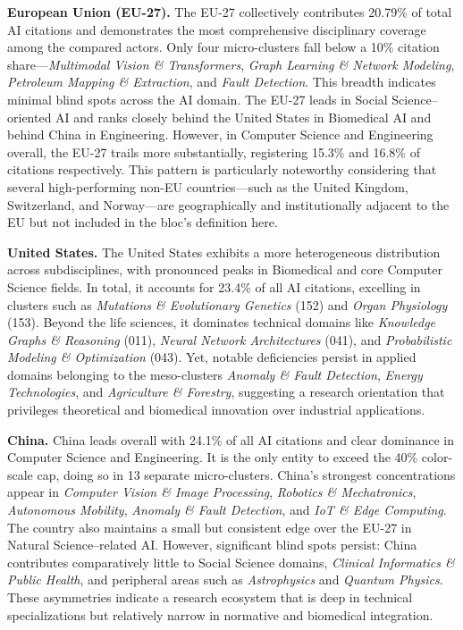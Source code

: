 \documentclass{article}
\begin{document}
\textbf{European Union (EU-27).}  
The EU-27 collectively contributes 20.79\% of total AI citations and demonstrates the most comprehensive disciplinary coverage among the compared actors. Only four micro-clusters fall below a 10\% citation share—\textit{Multimodal Vision \& Transformers}, \textit{Graph Learning \& Network Modeling}, \textit{Petroleum Mapping \& Extraction}, and \textit{Fault Detection}. This breadth indicates minimal blind spots across the AI domain. The EU-27 leads in Social Science–oriented AI and ranks closely behind the United States in Biomedical AI and behind China in Engineering. However, in Computer Science and Engineering overall, the EU-27 trails more substantially, registering 15.3\% and 16.8\% of citations respectively. This pattern is particularly noteworthy considering that several high-performing non-EU countries—such as the United Kingdom, Switzerland, and Norway—are geographically and institutionally adjacent to the EU but not included in the bloc’s definition here.

\textbf{United States.}  
The United States exhibits a more heterogeneous distribution across subdisciplines, with pronounced peaks in Biomedical and core Computer Science fields. In total, it accounts for 23.4\% of all AI citations, excelling in clusters such as \textit{Mutations \& Evolutionary Genetics} (152) and \textit{Organ Physiology} (153). Beyond the life sciences, it dominates technical domains like \textit{Knowledge Graphs \& Reasoning} (011), \textit{Neural Network Architectures} (041), and \textit{Probabilistic Modeling \& Optimization} (043). Yet, notable deficiencies persist in applied domains belonging to the meso-clusters \textit{Anomaly \& Fault Detection}, \textit{Energy Technologies}, and \textit{Agriculture \& Forestry}, suggesting a research orientation that privileges theoretical and biomedical innovation over industrial applications.

\textbf{China.}  
China leads overall with 24.1\% of all AI citations and clear dominance in Computer Science and Engineering. It is the only entity to exceed the 40\% color-scale cap, doing so in 13 separate micro-clusters. China’s strongest concentrations appear in \textit{Computer Vision \& Image Processing}, \textit{Robotics \& Mechatronics}, \textit{Autonomous Mobility}, \textit{Anomaly \& Fault Detection}, and \textit{IoT \& Edge Computing}. The country also maintains a small but consistent edge over the EU-27 in Natural Science–related AI. However, significant blind spots persist: China contributes comparatively little to Social Science domains, \textit{Clinical Informatics \& Public Health}, and peripheral areas such as \textit{Astrophysics} and \textit{Quantum Physics}. These asymmetries indicate a research ecosystem that is deep in technical specializations but relatively narrow in normative and biomedical integration.
\end{document}
